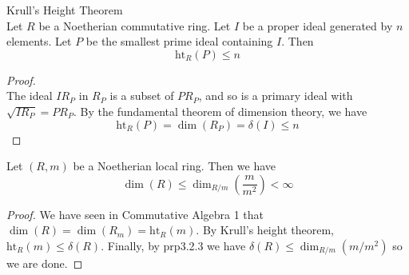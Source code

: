 \documentclass[a4paper]{article}
\begin{document}
\begin{thm}{Krull's Height Theorem}{}\\
Let $R$ be a Noetherian commutative ring. Let $I$ be a proper ideal generated by $n$ elements. Let $P$ be the smallest prime ideal containing $I$. Then $$\text{ht}_R(P)\leq n$$
\begin{proof}\\
The ideal $IR_P$ in $R_P$ is a subset of $PR_P$, and so is a primary ideal with $\sqrt{IR_P}=PR_P$. By the fundamental theorem of dimension theory, we have $$\text{ht}_R(P)=\dim(R_P)=\delta(I)\leq n$$
\end{proof}
\end{thm}

\begin{prp}{}{} Let $(R,m)$ be a Noetherian local ring. Then we have $$\dim(R)\leq\dim_{R/m}\left(\frac{m}{m^2}\right)<\infty$$ 
\begin{proof}
We have seen in Commutative Algebra 1 that $\dim(R)=\dim(R_m)=\text{ht}_R(m)$. By Krull's height theorem, $\text{ht}_R(m)\leq\delta(R)$. Finally, by prp3.2.3 we have $\delta(R)\leq\dim_{R/m}(m/m^2)$ so we are done. 
\end{proof}
\end{prp}
\end{document}
